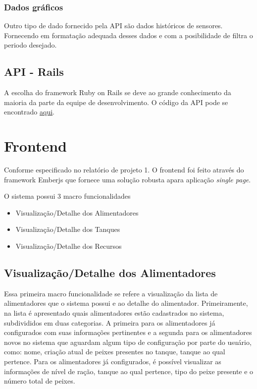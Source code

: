 \subsubsection{Dados gráficos}

Outro tipo de dado fornecido pela API são dados históricos de sensores. Fornecendo em formatação adequada desses dados e com a posibilidade de filtra o periodo desejado.

\subsection{API - Rails}

A escolha do framework Ruby on Rails se deve ao grande conhecimento da maioria da parte da equipe de desenvolvimento. O código da API pode se encontrado \href{https://github.com/PI2-Crema/API-rails}{aqui}.

\section{Frontend}

Conforme especificado no relatório de projeto 1. O frontend foi feito através do framework Emberjs que fornece uma solução robusta apara aplicação \textit{single page}.

O sistema possui 3 macro funcionalidades

\begin{itemize}
  \item Visualização/Detalhe dos Alimentadores
  \item Visualização/Detalhe dos Tanques
  \item Visualização/Detalhe dos Recursos
\end{itemize}

\subsection{Visualização/Detalhe dos Alimentadores}

Essa primeira macro funcionalidade se refere a visualização da lista de alimentadores
que o sistema possui e ao detalhe do alimentador. Primeiramente, na lista é apresentado quais alimentadores estão cadastrados
no sistema, subdivididos em duas categorias. A primeira para os alimentadores já configurados com suas informações pertinentes
e a segunda para os alimentadores novos no sistema que aguardam algum tipo de configuração por parte do usuário, como: nome, criação atual de peixes presentes no tanque,
tanque ao qual pertence. Para os alimentadores já configurados, é possível visualizar as informações de nível de ração, tanque ao qual pertence, tipo do peixe presente e o número total de peixes.

